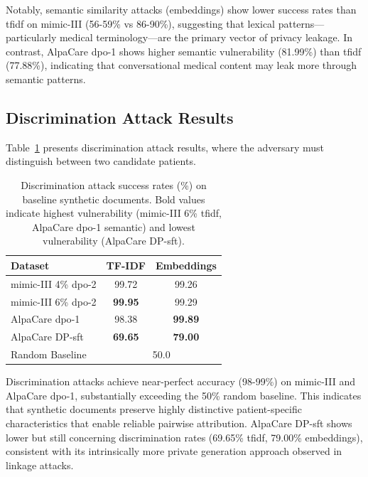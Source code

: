 Notably, semantic similarity attacks (embeddings) show lower success rates than \gls{tfidf} on \gls{mimic}-III (56-59\% vs 86-90\%), suggesting that lexical patterns—particularly medical terminology—are the primary vector of privacy leakage. In contrast, AlpaCare \gls{dpo}-1 shows higher semantic vulnerability (81.99\%) than \gls{tfidf} (77.88\%), indicating that conversational medical content may leak more through semantic patterns.

\subsection{Discrimination Attack Results}

Table~\ref{tab:baseline_discrimination} presents discrimination attack results, where the adversary must distinguish between two candidate patients.

\begin{table}[h]
\centering
\begin{tabular}{lcc}
\toprule
\textbf{Dataset} & \textbf{TF-IDF} & \textbf{Embeddings} \\
\midrule
\gls{mimic}-III 4\% \gls{dpo}-2 & 99.72 & 99.26 \\
\gls{mimic}-III 6\% \gls{dpo}-2 & \textbf{99.95} & 99.29 \\
AlpaCare \gls{dpo}-1 & 98.38 & \textbf{99.89} \\
AlpaCare DP-\gls{sft} & \textbf{69.65} & \textbf{79.00} \\
\midrule
Random Baseline & \multicolumn{2}{c}{50.0} \\
\bottomrule
\end{tabular}
\caption{Discrimination attack success rates (\%) on baseline synthetic documents. Bold values indicate highest vulnerability (\gls{mimic}-III 6\% \gls{tfidf}, AlpaCare \gls{dpo}-1 semantic) and lowest vulnerability (AlpaCare DP-\gls{sft}).}
\label{tab:baseline_discrimination}
\end{table}

Discrimination attacks achieve near-perfect accuracy (98-99\%) on \gls{mimic}-III and AlpaCare \gls{dpo}-1, substantially exceeding the 50\% random baseline. This indicates that synthetic documents preserve highly distinctive patient-specific characteristics that enable reliable pairwise attribution. AlpaCare DP-\gls{sft} shows lower but still concerning discrimination rates (69.65\% \gls{tfidf}, 79.00\% embeddings), consistent with its intrinsically more private generation approach observed in linkage attacks.

